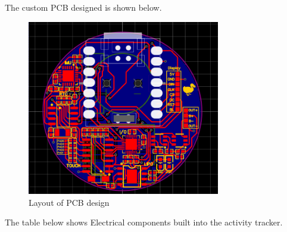 \documentclass[12pt, titlepage]{article}
\begin{document}
The custom PCB designed is shown below.

\begin{figure}[H]
	\begin{center}
		 \includegraphics[width=0.75\textwidth]{Layout}
		\caption{Layout of PCB design}
		\label{Layout} 
	\end{center}
\end{figure}

The table below shows Electrical components built into the activity tracker.
\end{document}
